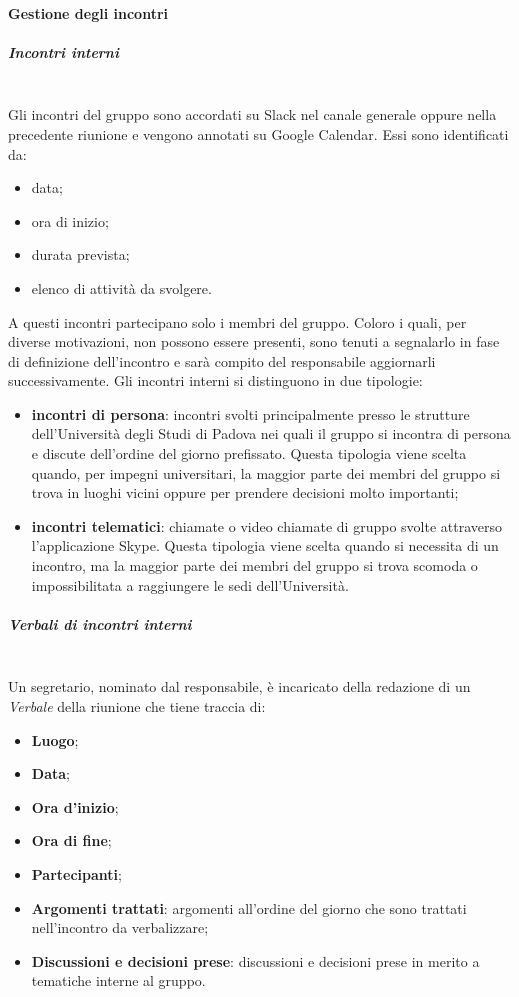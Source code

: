 		\paragraph{Gestione degli incontri}
			\subparagraph{Incontri interni}\mbox{}\\ [1mm]
				Gli incontri del gruppo sono accordati su Slack nel canale generale oppure nella precedente riunione e vengono annotati su Google Calendar. Essi sono identificati da:
				\begin{itemize}
					\item data;
					\item ora di inizio;
					\item durata prevista;
					\item elenco di attività da svolgere.
				\end{itemize}
				A questi incontri partecipano solo i membri del gruppo. Coloro i quali, per diverse motivazioni, non possono essere presenti, sono tenuti a segnalarlo in fase di definizione dell'incontro e sarà compito del responsabile aggiornarli successivamente.
				Gli incontri interni si distinguono in due tipologie:
				\begin{itemize}
					\item \textbf{incontri di persona}: incontri svolti principalmente presso le strutture dell'Università degli Studi di Padova nei quali il gruppo si incontra di persona e discute dell'ordine del giorno prefissato. Questa tipologia viene scelta quando, per impegni universitari, la maggior parte dei membri del gruppo si trova in luoghi vicini oppure per prendere decisioni molto importanti;
					\item \textbf{incontri telematici}: chiamate o video chiamate di gruppo svolte attraverso l'applicazione Skype. Questa tipologia viene scelta quando si necessita di un incontro, ma la maggior parte dei membri del gruppo si trova scomoda o impossibilitata a raggiungere le sedi dell'Università. 
				\end{itemize}
			\subparagraph{Verbali di incontri interni}\mbox{}\\ [1mm]
				Un segretario, nominato dal responsabile, è incaricato della redazione di un \textit{Verbale} della riunione che tiene traccia di:
				\begin{itemize}
					\item \textbf{Luogo};
					\item \textbf{Data};
					\item \textbf{Ora d'inizio};
					\item \textbf{Ora di fine};
					\item \textbf{Partecipanti};
					\item \textbf{Argomenti trattati}: argomenti all'ordine del giorno che sono trattati nell'incontro da verbalizzare;
					\item \textbf{Discussioni e decisioni prese}: discussioni e decisioni prese in merito a tematiche interne al gruppo.
				\end{itemize}
